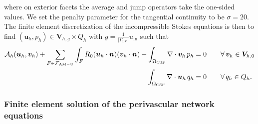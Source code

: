 \documentclass[fleqn,10pt]{wlscirep}
\begin{document}
where on exterior facets the average and jump operators take the one-sided values. We set the penalty parameter for the tangential continuity to be $\sigma = 20$. The finite element discretization of the incompressible Stokes equations is then to find $(\bm u_h, p_h) \in \bm V_{h,g} \times Q_h$ with $g  = \frac{1}{|\Gamma_{\mathrm{LV}}|} u_{\mathrm{in}}$  such that 
\begin{subequations}
\begin{align}
  \mathcal{A}_h(\bm u_h, \bm v_h)
  + \sum_{F \in \mathcal{F}_{\rm AM-U}} \int_{F} R_0 (\bm u_h \cdot \bm n) (\bm v_h \cdot \bm n)
  - \int_{\Omega_{\rm CSF}} \nabla \cdot \bm v_h \, p_h  &= 0 \qquad \forall \, \bm v_h \in \bm V_{h,0} \\ 
\int_{\Omega_{\rm CSF}} \nabla \cdot \bm u_h \, q_h  &= 0 \qquad \forall \, q_h \in Q_h.
\end{align}
\end{subequations}

\subsubsection{Finite element solution of the perivascular network equations} 
\end{document}
